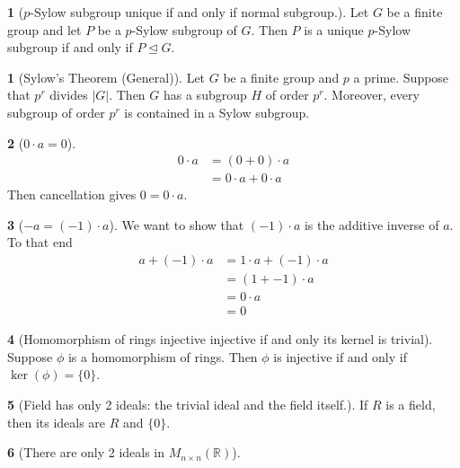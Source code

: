 \documentclass[12pt]{article}
\theoremstyle{definition}
\newtheorem{theorem}{\color{ForestGreen}{\textbf{Theorem}}}
\newtheorem{corollary}{\color{ForestGreen}{\textbf{Corollary}}}
\newcommand{\R}{\mathbb{R}}
\begin{document}
\begin{corollary}[$p$-Sylow subgroup unique if and only if normal subgroup.]
Let $G$ be a finite group and let $P$ be a $p$-Sylow subgroup of $G$. Then $P$ is a unique $p$-Sylow subgroup if and only if $P \trianglelefteq G$.
\end{corollary}

\begin{theorem}[Sylow's Theorem (General)]
Let $G$ be a finite group and $p$ a prime. Suppose that $p^r$ divides $|G|$. Then $G$ has a subgroup $H$ of order $p^r$. Moreover, every subgroup of order $p^r$ is contained in a Sylow subgroup.
\end{theorem}

\begin{theorem}[$0\cdot a = 0$]
\begin{align*}
0 \cdot a &= (0 + 0) \cdot a \tag{$0$ additive identity}\\
&= 0\cdot a + 0 \cdot a \tag{distributivity}
\end{align*}
Then cancellation gives $0 = 0 \cdot a$.
\end{theorem}

\begin{theorem}[$-a = (-1)\cdot a$]
We want to show that $(-1)\cdot a$ is the additive inverse of $a$. To that end
\begin{align*}
a + (-1)\cdot a &= 1 \cdot a + (-1) \cdot a \tag{$1$ multiplicative identity}\\
&= (1 + -1) \cdot a \tag{distributivity}\\
&= 0 \cdot a \\
&= 0
\end{align*}
\end{theorem}

\begin{theorem}[Homomorphism of rings injective injective if and only its kernel is trivial]
Suppose $\phi$ is a homomorphism of rings. Then $\phi$ is injective if and only if $\ker(\phi) = \{0\}$.
\end{theorem}

\begin{theorem}[Field has only 2 ideals: the trivial ideal and the field itself.]
If $R$ is a field, then its ideals are $R$ and $\{0\}$.
\end{theorem}

\begin{theorem}[There are only 2 ideals in $M_{n\times n}(\R)$]
\end{theorem}
\end{document}
